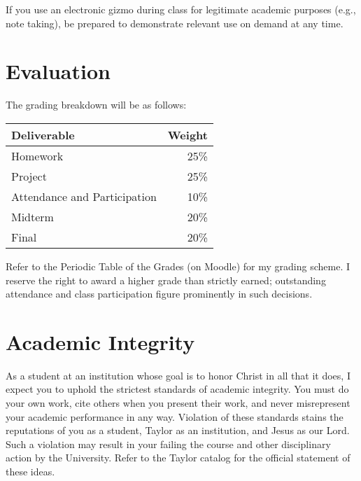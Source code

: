 \documentclass{article}
\begin{document}
If you use an electronic gizmo during class for legitimate academic purposes (e.g., note
taking), be prepared to demonstrate relevant use on demand at any time.
\section{Evaluation}
\label{sec-8}
The grading breakdown will be as follows:
\begin{center}
\begin{tabular}{lr}
Deliverable & Weight\\
\hline
Homework & 25\%\\
Project & 25\%\\
Attendance and Participation & 10\%\\
Midterm & 20\%\\
Final & 20\%\\
\end{tabular}
\end{center}
Refer to the Periodic Table of the Grades (on Moodle) for my grading scheme. I reserve the
right to award a higher grade than strictly earned; outstanding attendance and class
participation figure prominently in such decisions.
\section{Academic Integrity}
\label{sec-9}
As a student at an institution whose goal is to honor Christ in all that it does,
I expect you to uphold the strictest standards of academic integrity.
You must do your own work, cite others when you present their work,
and never misrepresent your academic performance in any way.
Violation of these standards stains the reputations of you as a student,
Taylor as an institution,
and Jesus as our Lord.
Such a violation may result in your failing the course
and other disciplinary action by the University.
Refer to the Taylor catalog for the official statement of these ideas.
\end{document}
